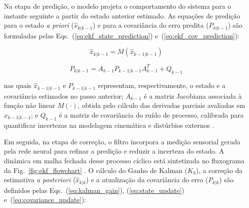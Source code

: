 Na etapa de predição, o modelo projeta o comportamento do sistema para o instante seguinte a partir do estado anterior estimado. As equações de predição para o estado \textit{a priori} ($\hat{x}_{k|k-1}$) e para a covariância do erro predita ($P_{k|k-1}$) são formuladas pelas Eqs.~(\ref{eq:ekf_state_prediction}) e~(\ref{eq:ekf_cov_prediction}):

\begin{equation}
\hat{x}_{k|k-1} = M(\hat{x}_{k-1|k-1})
\label{eq:ekf_state_prediction}
\end{equation}

\begin{equation}
P_{k|k-1} = A_{k-1} P_{k-1|k-1} A_{k-1}^{T} + Q_{k-1}
\label{eq:ekf_cov_prediction}
\end{equation}

\noindent nas quais $\hat{x}_{k-1|k-1}$ e $P_{k-1|k-1}$ representam, respectivamente, o estado e a covariância estimados no passo anterior; $A_{k-1}$ é a matriz Jacobiana associada à função não linear $M(\cdot)$, obtida pelo cálculo das derivadas parciais avaliadas em $\hat{x}_{k-1|k-1}$; e $Q_{k-1}$ é a matriz de covariância do ruído de processo, calibrada para quantificar incertezas na modelagem cinemática e distúrbios externos \cite{kalman_beginners}.

Em seguida, na etapa de correção, o filtro incorpora a medição sensorial gerada pela rede neural para refinar a predição e reduzir a incerteza do estado. A dinâmica em malha fechada desse processo cíclico está sintetizada no fluxograma da Fig.~\ref{fig:ekf_flowchart} \cite{kalman_beginners}. O cálculo do Ganho de Kalman ($K_k$), a correção da estimativa \textit{a posteriori} ($\hat{x}_{k|k}$) e a atualização da covariância do erro ($P_{k|k}$) são definidos pelas Eqs.~(\ref{eq:kalman_gain}), (\ref{eq:state_update}) e~(\ref{eq:covariance_update}):

